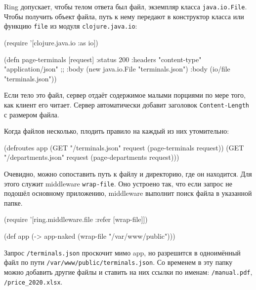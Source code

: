 
Ring допускает, чтобы телом ответа был файл, экземпляр класса
\verb|java.io.File|. Чтобы получить объект файла, путь к нему передают в
конструктор класса или функцию \verb|file| из модуля \verb|clojure.java.io|:

\begin{english}
  \begin{clojure}
(require '[clojure.java.io :as io])

(defn page-terminals [request]
  {:status 200
   :headers {"content-type" "application/json"}
   ;; :body (new java.io.File "terminals.json")
   :body (io/file "terminals.json")})
  \end{clojure}
\end{english}


Если тело это файл, сервер отдаёт содержимое малыми порциями по мере того, как
клиент его читает. Сервер автоматически добавит заголовок
\verb|Content-Length| с размером файла.

Когда файлов несколько, плодить правило на каждый из них утомительно:

\begin{english}
  \begin{clojure}
(defroutes app
  (GET "/terminals.json"   request (page-terminals request))
  (GET "/departments.json" request (page-departments request)))
  \end{clojure}
\end{english}


Очевидно, можно сопоставить путь к файлу и директорию, где он находится. Для
этого служит middleware \verb|wrap-file|. Оно устроено так, что если запрос не
подошёл основному приложению, middleware выполнит поиск файла в указанной папке.

\begin{english}
  \begin{clojure}
(require '[ring.middleware.file :refer [wrap-file]])

(def app (-> app-naked
             (wrap-file "/var/www/public")))
  \end{clojure}
\end{english}

Запрос \verb|/terminals.json| проскочит мимо app, но разрешится в
одноимённый файл по пути \verb|/var/www/public/terminals.json|. Со
временем в эту папку можно добавить другие файлы и ставить на них ссылки по
именам: \verb|/manual.pdf|, \verb|/price_2020.xlsx|.

